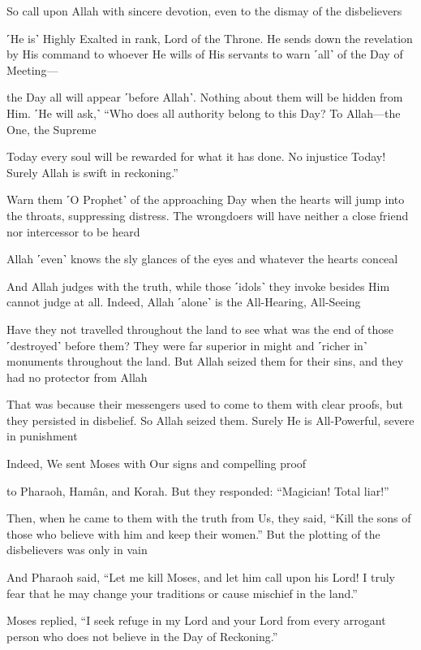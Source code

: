 So call upon Allah with sincere devotion, even to the dismay of the disbelievers

˹He is˺ Highly Exalted in rank, Lord of the Throne. He sends down the revelation by His command to whoever He wills of His servants to warn ˹all˺ of the Day of Meeting—

the Day all will appear ˹before Allah˺. Nothing about them will be hidden from Him. ˹He will ask,˺ “Who does all authority belong to this Day? To Allah—the One, the Supreme

Today every soul will be rewarded for what it has done. No injustice Today! Surely Allah is swift in reckoning.”

Warn them ˹O Prophet˺ of the approaching Day when the hearts will jump into the throats, suppressing distress. The wrongdoers will have neither a close friend nor intercessor to be heard

Allah ˹even˺ knows the sly glances of the eyes and whatever the hearts conceal

And Allah judges with the truth, while those ˹idols˺ they invoke besides Him cannot judge at all. Indeed, Allah ˹alone˺ is the All-Hearing, All-Seeing

Have they not travelled throughout the land to see what was the end of those ˹destroyed˺ before them? They were far superior in might and ˹richer in˺ monuments throughout the land. But Allah seized them for their sins, and they had no protector from Allah

That was because their messengers used to come to them with clear proofs, but they persisted in disbelief. So Allah seized them. Surely He is All-Powerful, severe in punishment

Indeed, We sent Moses with Our signs and compelling proof

to Pharaoh, Hamân, and Korah. But they responded: “Magician! Total liar!”

Then, when he came to them with the truth from Us, they said, “Kill the sons of those who believe with him and keep their women.” But the plotting of the disbelievers was only in vain

And Pharaoh said, “Let me kill Moses, and let him call upon his Lord! I truly fear that he may change your traditions or cause mischief in the land.”

Moses replied, “I seek refuge in my Lord and your Lord from every arrogant person who does not believe in the Day of Reckoning.”

